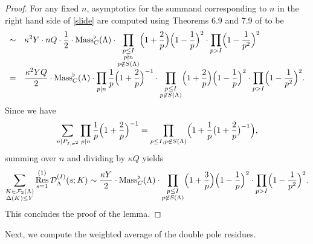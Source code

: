\documentclass[10pt]{article}
\theoremstyle{plain}
\theoremstyle{definition}
\theoremstyle{remark}
\DeclareMathOperator{\Res}{Res}
\def\Mass{{\rm Mass}}
\def\Disc{{\Delta}}
\def\FF{{\mathcal F}}
\def\cD{{\mathcal D}}
\begin{document}
\begin{proof}
For any fixed $n$, asymptotics for the summand corresponding to $n$ in
the right hand side of \eqref{slide} are computed using Theorems 6.9
and 7.9 of \cite{D4preprint} to be
\begin{equation*}
\begin{array}{rl}
\sim&
\displaystyle \kappa^2Y \cdot nQ \cdot
\frac12 \cdot \Mass^\flat_C(\Lambda)
\cdot\prod_{\substack{p\leq I\\p\nmid n \\ p\not\in S(\Lambda)}} \Bigl(1+\frac{2}{p}\Bigr)
\Bigl(1-\frac{1}{p}\Bigr)^2
\cdot\prod_{p>I}\Bigl(1-\frac{1}{p^2}\Bigr)^2\\
=&\displaystyle
\frac{\kappa^2YQ}{2}\cdot \Mass^\flat_C(\Lambda)
\cdot\prod_{p\mid n}\frac{1}{p}\Bigl(1+\frac{2}{p}\Bigr)^{-1}
\cdot\prod_{\substack{p\leq I \\ p\not\in S(\Lambda)}} \Bigl(1+\frac{2}{p}\Bigr)
\Bigl(1-\frac{1}{p}\Bigr)^2
\cdot\prod_{p>I}\Bigl(1-\frac{1}{p^2}\Bigr)^2.
\end{array}
\end{equation*}
Since we have
\begin{equation*}
\sum_{n\mid P_{I,\sigma^2}}\prod_{p\mid n}\frac{1}{p}\Bigl(1+\frac{2}{p}\Bigr)^{-1}
=\prod_{p\leq I,p\not\in S(\Lambda)}\Bigl(1+\frac{1}{p}\bigl(1+\frac{2}{p}\bigr)^{-1}
\Bigr),
\end{equation*}
summing over $n$ and dividing by $\kappa Q$ yields
$$\sum_{\substack{K\in\FF_2(\Lambda)\\\Disc(K)\leq Y}}
\Res^{(1)}_{s=1}\cD_\Lambda^{(I)}(s;K)
  \sim \frac{\kappa Y}{2}\cdot \Mass^\flat_C(\Lambda)
\cdot\prod_{\substack{p\leq I \\ p\not\in S(\Lambda)}} \Bigl(1+\frac{3}{p}\Bigr)
\Bigl(1-\frac{1}{p}\Bigr)^2
\cdot\prod_{p>I}\Bigl(1-\frac{1}{p^2}\Bigr)^2.$$
This concludes the proof of the lemma.
\end{proof}

Next, we compute the weighted average of the double pole residues.
\end{document}
